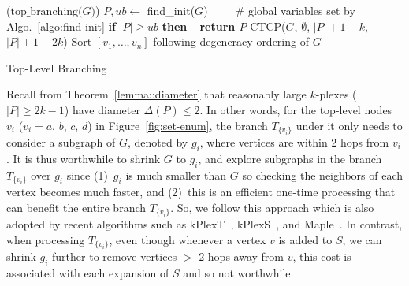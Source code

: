 \documentclass[sigconf, nonacm]{acmart}
\begin{document}
\begin{algorithm}[!t]
    \DontPrintSemicolon
    \Begin($\text{top\_branching}{(}G{)}$){
        $P, ub \gets $ find\_init($G$)\ \ \ \ \ \# global variables set by Algo.~\ref{algo:find-init}\;\label{top:l1}
        {\bf if} $|P|\ge ub$ {\bf then\ \ return $P$}\;\label{top:l2}
        CTCP($G$, $\emptyset$, $|P|+1-k$, $|P|+1-2k$)\;\label{top:l3}
        Sort $[v_1,\dots, v_n]$ following degeneracy ordering of $G$\;\label{top:l4}
        \;
}
\caption{Top-Level Branching}    
\label{algo:toplevel}
\end{algorithm}

\vspace{1mm}
 Recall from Theorem~\ref{lemma::diameter} that reasonably large $k$-plexes ($|P|\geq 2k-1$) have diameter $\Delta(P)\leq 2$. In other words, for the top-level nodes ${v_i}$ ($v_i=a$, $b$, $c$, $d$) in Figure~\ref{fig:set-enum}, the branch $T_{\{v_i\}}$ under it only needs to consider a subgraph of $G$, denoted by $g_i$, where vertices are within 2 hops from $v_i$. It is thus worthwhile to shrink $G$ to $g_i$, and explore subgraphs in the branch $T_{\{v_i\}}$ over $g_i$ since (1)~$g_i$ is much smaller than $G$ so checking the neighbors of each vertex becomes much faster, and (2)~this is an efficient one-time processing that can benefit the entire branch $T_{\{v_i\}}$. So, we follow this approach which is also adopted by recent algorithms such as kPlexT~\cite{kPlexT}, kPlexS~\cite{kPlexT}, and Maple~\cite{Maple}. In contrast, when processing $T_{\{v_i\}}$, even though whenever a vertex $v$ is added to $S$, we can shrink $g_i$ further to remove vertices $>$ 2 hops away from $v$, this cost is associated with each expansion of $S$ and so not worthwhile.
\end{document}

